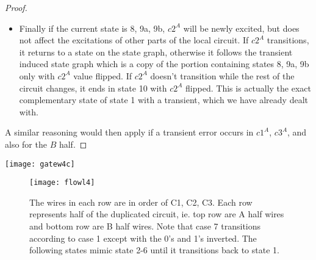 \documentclass{article}
\begin{document}
\begin{proof}
\begin{itemize}
	\item
Finally if the current state is 8, 9a, 9b, $c2^A$ will be newly excited, but does not affect the excitations of other parts of the local circuit.  If $c2^A$ transitions, it returns to a state on the state graph, otherwise it follows the transient induced state graph which is a copy of the portion containing states 8, 9a, 9b only with $c2^A$ value flipped.  If $c2^A$ doesn't transition while the rest of the circuit changes, it ends in state 10 with $c2^A$ flipped.  This is actually the exact complementary state of state 1 with a transient, which we have already dealt with.
\end{itemize}
A similar reasoning would then apply if a transient error occurs in $c1^A$, $c3^A$, and also for the $B$ half.  
\end{proof}

\texttt{[image: gatew4c]}\newline
\begin{figure}
  \centering
    \texttt{[image: flowl4]}
  \caption{The wires in each row are in order of C1, C2, C3.  Each row represents half of the duplicated circuit, ie. top row are A half wires and bottom row are B half wires.  Note that case 7 transitions according to case 1 except with the 0's and 1's inverted.  The following states mimic state 2-6 until it transitions back to state 1.}
\end{figure}
\end{document}
